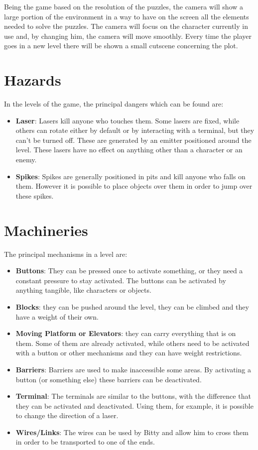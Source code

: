 \documentclass[12pt, a4paper]{report}
\begin{document}
Being the game based on the resolution of the puzzles, the camera will show a large portion of the environment in a way to have on the screen all the elements needed to solve the puzzles. The camera will focus on the character currently in use and, by changing him, the camera will move smoothly. Every time the player goes in a new level there will be shown a small cutscene concerning the plot.


\section*{Hazards}
In the levels of the game, the principal dangers which can be found are:
\begin{itemize}
	\item \textbf{Laser}: Lasers kill anyone who touches them. Some lasers are fixed, while others can rotate either by default or by interacting with a terminal, but they can't be turned off. These are generated by an emitter positioned around the level. These lasers have no effect on anything other than a character or an enemy.
	\item \textbf{Spikes}: Spikes are generally positioned in pits and kill anyone who falls on them. However it is possible to place objects over them in order to jump over these spikes.
\end{itemize}

\section*{Machineries}
The principal mechanisms in a level are:
\begin{itemize}
	\item \textbf{Buttons}: They can be pressed once to activate something, or they need a constant pressure to stay activated. The buttons can be activated by anything tangible, like characters or objects.
	\item \textbf{Blocks}: they can be pushed around the level, they can be climbed and they have a weight of their own.
	\item \textbf{Moving Platform or Elevators}: they can carry everything that is on them. Some of them are already activated, while others need to be activated with a button or other mechanisms and they can have weight restrictions.
	\item \textbf{Barriers}: Barriers are used to make inaccessible some areas. By activating a button (or something else) these barriers can be deactivated.
	\item \textbf{Terminal}: The terminals are similar to the buttons, with the difference that they can be activated and deactivated. Using them, for example, it is possible to change the direction of a laser.
	\item \textbf{Wires/Links}: The wires can be used by Bitty and allow him to cross them in order to be transported to one of the ends.
\end{itemize}
\end{document}
